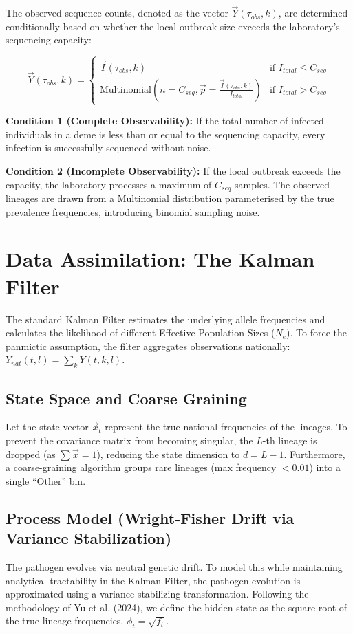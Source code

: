 \documentclass[12pt]{article}
\begin{document}
The observed sequence counts, denoted as the vector $\vec{Y}(\tau_{obs}, k)$, are determined conditionally based on whether the local outbreak size exceeds the laboratory's sequencing capacity:

\begin{equation}
    \vec{Y}(\tau_{obs}, k) = 
    \begin{cases} 
      \vec{I}(\tau_{obs}, k) & \text{if } I_{total} \leq C_{seq} \\
      \text{Multinomial}\left(n = C_{seq}, \vec{p} = \frac{\vec{I}(\tau_{obs}, k)}{I_{total}}\right) & \text{if } I_{total} > C_{seq}
   \end{cases}
\end{equation}

\textbf{Condition 1 (Complete Observability):} If the total number of infected individuals in a deme is less than or equal to the sequencing capacity, every infection is successfully sequenced without noise. 

\textbf{Condition 2 (Incomplete Observability):} If the local outbreak exceeds the capacity, the laboratory processes a maximum of $C_{seq}$ samples. The observed lineages are drawn from a Multinomial distribution parameterised by the true prevalence frequencies, introducing binomial sampling noise.

\section{Data Assimilation: The Kalman Filter}
The standard Kalman Filter estimates the underlying allele frequencies and calculates the likelihood of different Effective Population Sizes ($N_e$). To force the panmictic assumption, the filter aggregates observations nationally: $Y_{nat}(t, l) = \sum_k Y(t, k, l)$.

\subsection{State Space and Coarse Graining}
Let the state vector $\vec{x}_t$ represent the true national frequencies of the lineages. To prevent the covariance matrix from becoming singular, the $L$-th lineage is dropped (as $\sum \vec{x} = 1$), reducing the state dimension to $d = L-1$. Furthermore, a coarse-graining algorithm groups rare lineages (max frequency $< 0.01$) into a single ``Other'' bin.

\subsection{Process Model (Wright-Fisher Drift via Variance Stabilization)}
The pathogen evolves via neutral genetic drift. To model this while maintaining analytical tractability in the Kalman Filter, the pathogen evolution is approximated using a variance-stabilizing transformation. Following the methodology of Yu et al. (2024), we define the hidden state as the square root of the true lineage frequencies, $\phi_{t} = \sqrt{f_t}$.
\end{document}
